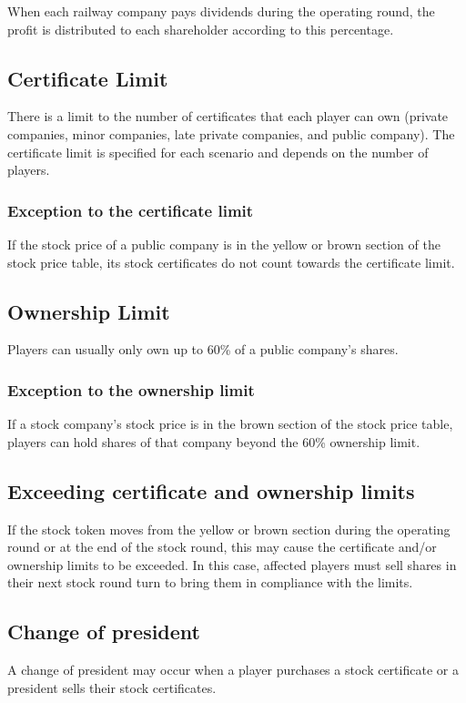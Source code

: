 \documentclass{article}
\begin{document}
\begin{CJK}{UTF8}{min}
\begin{multicols}{2}
When each railway company pays dividends during the operating round,
the profit is distributed to each shareholder according to this
percentage.

\subsection{Certificate Limit}
There is a limit to the number of certificates that each player can
own (private companies, minor companies, late private companies, and
public company). The certificate limit is specified for each scenario
and depends on the number of players.

\subsubsection{Exception to the certificate limit}
\label{sec:certificate-limit-exceptions}
If the stock price of a public company is in the yellow or brown
section of the stock price table, its stock certificates do not count
towards the certificate limit.

\subsection{Ownership Limit}
Players can usually only own up to 60\% of a public company's
shares.

\subsubsection{Exception to the ownership limit}
\label{sec:ownership-limit-exceptions}
If a stock company's stock price is in the brown section of the stock
price table, players can hold shares of that company beyond the 60\%
ownership limit.

\subsection{Exceeding certificate and ownership limits}
If the stock token moves from the yellow or brown section during the
operating round or at the end of the stock round, this may cause the
certificate and/or ownership limits to be exceeded. In this case,
affected players must sell shares in their next stock round turn to
bring them in compliance with the limits.

\subsection{Change of president} \label{shares-change-president}
A change of president may occur when a player purchases a stock
certificate or a president sells their stock certificates.


\end{multicols}
\end{CJK}
\end{document}
